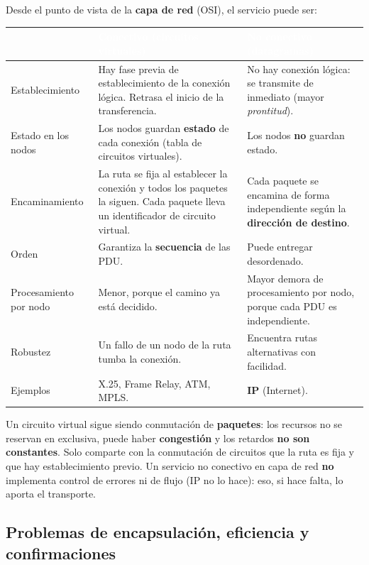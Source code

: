 \documentclass[11pt,a4paper]{article}
\newcommand{\hd}[1]{\cellcolor{uahblue}\textcolor{white}{\textbf{#1}}}
\begin{document}
Desde el punto de vista de la \textbf{capa de red} (OSI), el servicio puede ser:

\begin{tabularx}{\textwidth}{@{}L{3.2cm}XX@{}}
\toprule
 & \hd{Conectivo (circuitos virtuales)} & \hd{No conectivo (datagramas)} \\
\midrule
Establecimiento & Hay fase previa de establecimiento de la conexión lógica. Retrasa el inicio de la transferencia. & No hay conexión lógica: se transmite de inmediato (mayor \emph{prontitud}). \\
Estado en los nodos & Los nodos guardan \textbf{estado} de cada conexión (tabla de circuitos virtuales). & Los nodos \textbf{no} guardan estado. \\
Encaminamiento & La ruta se fija al establecer la conexión y todos los paquetes la siguen. Cada paquete lleva un identificador de circuito virtual. & Cada paquete se encamina de forma independiente según la \textbf{dirección de destino}. \\
Orden & Garantiza la \textbf{secuencia} de las PDU. & Puede entregar desordenado. \\
Procesamiento por nodo & Menor, porque el camino ya está decidido. & Mayor demora de procesamiento por nodo, porque cada PDU es independiente. \\
Robustez & Un fallo de un nodo de la ruta tumba la conexión. & Encuentra rutas alternativas con facilidad. \\
Ejemplos & X.25, Frame Relay, ATM, MPLS. & \textbf{IP} (Internet). \\
\bottomrule
\end{tabularx}

\begin{ojo}
Un circuito virtual sigue siendo conmutación de \textbf{paquetes}: los recursos no se reservan en exclusiva, puede haber \textbf{congestión} y los retardos \textbf{no son constantes}. Solo comparte con la conmutación de circuitos que la ruta es fija y que hay establecimiento previo. Un servicio no conectivo en capa de red \textbf{no} implementa control de errores ni de flujo (IP no lo hace): eso, si hace falta, lo aporta el transporte.
\end{ojo}

\subsection{Problemas de encapsulación, eficiencia y confirmaciones}
\end{document}
